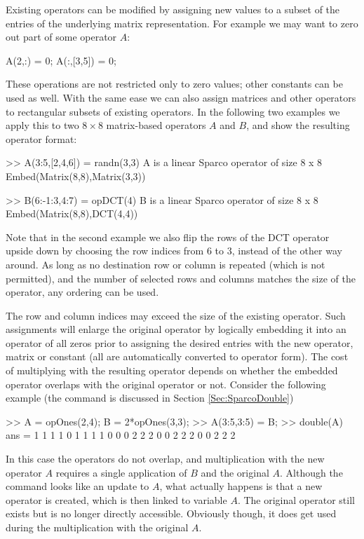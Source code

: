 Existing operators can be modified by assigning new values to a subset
of the entries of the underlying matrix representation. For example we
may want to zero out part of some operator $A$:
\begin{codeblock}
A(2,:) = 0;      %
A(:,[3,5]) = 0;  %
\end{codeblock}
These operations are not restricted only to zero values; other
constants can be used as well. With the same ease we can also assign
matrices and other operators to rectangular subsets of existing
operators. In the following two examples we apply this to two $8\times
8$ matrix-based operators $A$ and $B$, and show the resulting operator
format:
\begin{codeblock}
>> A(3:5,[2,4,6]) = randn(3,3)
A is a linear Sparco operator of size 8 x 8
         Embed(Matrix(8,8),Matrix(3,3))

>> B(6:-1:3,4:7) = opDCT(4) 
B is a linear Sparco operator of size 8 x 8
         Embed(Matrix(8,8),DCT(4,4))
\end{codeblock}
Note that in the second example we also flip the rows of the DCT
operator upside down by choosing the row indices from 6 to 3, instead
of the other way around. As long as no destination row or column is
repeated (which is not permitted), and the number of selected rows and
columns matches the size of the operator, any ordering can be used.

The row and column indices may exceed the size of the existing
operator. Such assignments will enlarge the original operator by
logically embedding it into an operator of all zeros prior to
assigning the desired entries with the new operator, matrix or
constant (all are automatically converted to operator form). The cost
of multiplying with the resulting operator depends on whether the
embedded operator overlaps with the original operator or not. Consider
the following example (the  command is discussed in
Section \ref{Sec:SparcoDouble})
\begin{codeblock}
>> A = opOnes(2,4); B = 2*opOnes(3,3);
>> A(3:5,3:5) = B;
>> double(A)
ans =
     1     1     1     1     0
     1     1     1     1     0
     0     0     2     2     2
     0     0     2     2     2
     0     0     2     2     2
\end{codeblock}
In this case the operators do not overlap, and multiplication with the
new operator $A$ requires a single application of $B$ and the original
$A$.  Although the command  looks like an
update to $A$, what actually happens is that a new operator is
created, which is then linked to variable $A$. The original operator
 still exists but is no longer directly
accessible. Obviously though, it does get used during the
multiplication with the original $A$.

